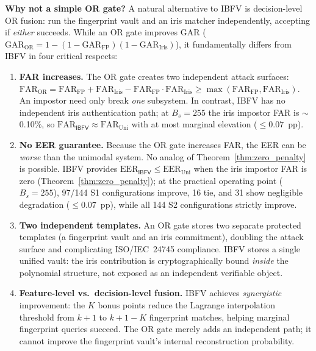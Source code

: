 \documentclass[3p,twocolumn]{elsarticle}
\newcommand{\IBFV}{\textsf{IBFV}}
\newcommand{\EER}{\mathrm{EER}}
\newcommand{\GAR}{\mathrm{GAR}}
\newcommand{\FAR}{\mathrm{FAR}}
\begin{document}
\textbf{Why not a simple OR gate?} A natural alternative to \IBFV{} is decision-level OR fusion: run the fingerprint vault and an iris matcher independently, accepting if \emph{either} succeeds. While an OR gate improves GAR ($\GAR_{\text{OR}} = 1 - (1 - \GAR_{\text{FP}})(1 - \GAR_{\text{Iris}})$), it fundamentally differs from \IBFV{} in four critical respects:
\begin{enumerate}
    \item \textbf{FAR increases.} The OR gate creates two independent attack surfaces: $\FAR_{\text{OR}} = \FAR_{\text{FP}} + \FAR_{\text{Iris}} - \FAR_{\text{FP}} \cdot \FAR_{\text{Iris}} \geq \max(\FAR_{\text{FP}}, \FAR_{\text{Iris}})$. An impostor need only break \emph{one} subsystem. In contrast, \IBFV{} has no independent iris authentication path; at $B_s = 255$ the iris impostor FAR is $\sim$0.10\%, so $\FAR_{\IBFV} \approx \FAR_{\text{Uni}}$ with at most marginal elevation ($\leq 0.07$~pp).
    \item \textbf{No EER guarantee.} Because the OR gate increases FAR, the EER can be \emph{worse} than the unimodal system. No analog of Theorem~\ref{thm:zero_penalty} is possible. \IBFV{} provides $\EER_{\IBFV} \leq \EER_{\text{Uni}}$ when the iris impostor FAR is zero (Theorem~\ref{thm:zero_penalty}); at the practical operating point ($B_s = 255$), 97/144 S1 configurations improve, 16 tie, and 31 show negligible degradation ($\leq 0.07$~pp), while all 144 S2 configurations strictly improve.
    \item \textbf{Two independent templates.} An OR gate stores two separate protected templates (a fingerprint vault and an iris commitment), doubling the attack surface and complicating ISO/IEC~24745 compliance. \IBFV{} stores a single unified vault: the iris contribution is cryptographically bound \emph{inside} the polynomial structure, not exposed as an independent verifiable object.
    \item \textbf{Feature-level vs.\ decision-level fusion.} \IBFV{} achieves \emph{synergistic} improvement: the $K$ bonus points reduce the Lagrange interpolation threshold from $k{+}1$ to $k{+}1{-}K$ fingerprint matches, helping marginal fingerprint queries succeed. The OR gate merely adds an independent path; it cannot improve the fingerprint vault's internal reconstruction probability.
\end{enumerate}
\end{document}
